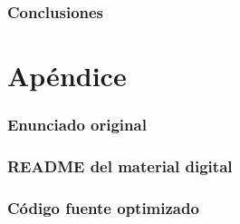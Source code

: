 \documentclass[a4paper,11pt]{article}
\begin{document}
\section{Conclusiones}


\clearpage

\part{Apéndice}
\appendix

\section{Enunciado original}\label{sec:enunciado}


\clearpage
\section{README del material digital}\label{sec:readme}


\clearpage
\section{Código fuente optimizado}\label{sec:source}
\clearpage

\end{document}
